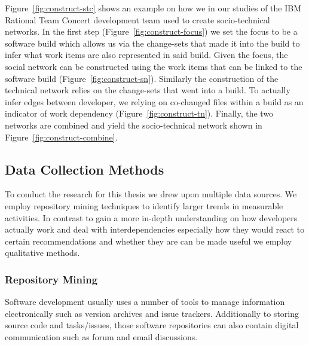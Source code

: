 Figure~\ref{fig:construct-stc} shows an example on how we in our studies of the IBM Rational Team Concert development team used to create socio-technical networks.
In the first step (Figure~\ref{fig:construct-focus}) we set the focus to be a software build which allows us via the change-sets that made it into the build to infer what work items are also represented in said build.
Given the focus, the social network can be constructed using the work items that can be linked to the software build (Figure~\ref{fig:construct-sn}).
Similarly the construction of the technical network relies on the change-sets that went into a build. 
To actually infer edges between developer, we relying on co-changed files within a build as an indicator of work dependency (Figure~\ref{fig:construct-tn}).
Finally, the two networks are combined and yield the socio-technical network shown in Figure~\ref{fig:construct-combine}.

\subsection{Data Collection Methods}
\label{c5:sec:datacollection}
To conduct the research for this thesis we drew upon multiple data sources.
We employ repository mining techniques to identify larger trends in measurable activities.
In contrast to gain a more in-depth understanding on how developers actually work and deal with interdependencies especially how they would react to certain recommendations and whether they are can be made useful we employ qualitative methods.

\subsubsection{Repository Mining}
Software development usually uses a number of tools to manage information electronically such as version archives and issue trackers.
Additionally to storing source code and tasks/issues, those software repositories can also contain digital communication such as forum and email discussions.



